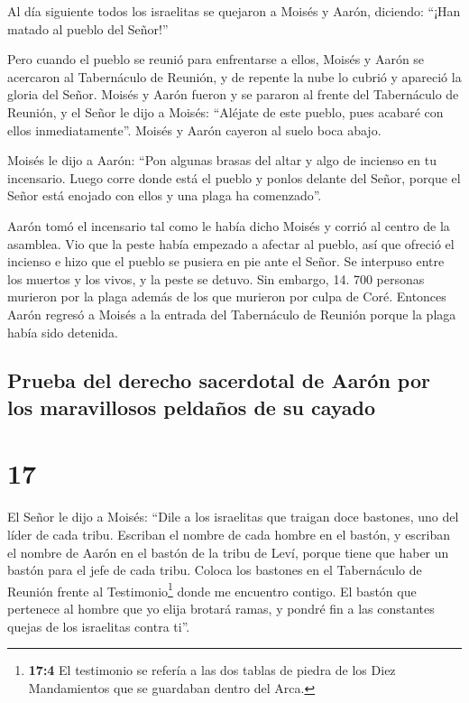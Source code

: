  Al día siguiente todos los israelitas se quejaron a
Moisés y Aarón, diciendo: ``¡Han matado al pueblo del Señor!''

 Pero cuando el pueblo se reunió para enfrentarse a
ellos, Moisés y Aarón se acercaron al Tabernáculo de Reunión, y de
repente la nube lo cubrió y apareció la gloria del Señor.
 Moisés y Aarón fueron y se pararon al frente del
Tabernáculo de Reunión,  y el Señor le dijo a Moisés:
 ``Aléjate de este pueblo, pues acabaré con ellos
inmediatamente''. Moisés y Aarón cayeron al suelo boca abajo.

 Moisés le dijo a Aarón: ``Pon algunas brasas del altar y
algo de incienso en tu incensario. Luego corre donde está el pueblo y
ponlos delante del Señor, porque el Señor está enojado con ellos y una
plaga ha comenzado''.

 Aarón tomó el incensario tal como le había dicho Moisés
y corrió al centro de la asamblea. Vio que la peste había empezado a
afectar al pueblo, así que ofreció el incienso e hizo que el pueblo se
pusiera en pie ante el Señor.  Se interpuso entre los
muertos y los vivos, y la peste se detuvo.  Sin embargo,
14. 700 personas murieron por la plaga además de los que murieron por
culpa de Coré.  Entonces Aarón regresó a Moisés a la
entrada del Tabernáculo de Reunión porque la plaga había sido detenida.

\hypertarget{prueba-del-derecho-sacerdotal-de-aaruxf3n-por-los-maravillosos-peldauxf1os-de-su-cayado}{%
\subsection{Prueba del derecho sacerdotal de Aarón por los maravillosos
peldaños de su
cayado}\label{prueba-del-derecho-sacerdotal-de-aaruxf3n-por-los-maravillosos-peldauxf1os-de-su-cayado}}

\hypertarget{section-16}{%
\section{17}\label{section-16}}

 El Señor le dijo a Moisés:  ``Dile a los
israelitas que traigan doce bastones, uno del líder de cada tribu.
Escriban el nombre de cada hombre en el bastón,  y
escriban el nombre de Aarón en el bastón de la tribu de Leví, porque
tiene que haber un bastón para el jefe de cada tribu. 
Coloca los bastones en el Tabernáculo de Reunión frente al
Testimonio\footnote{\textbf{17:4} El testimonio se refería a las dos
  tablas de piedra de los Diez Mandamientos que se guardaban dentro del
  Arca.} donde me encuentro contigo.  El bastón que
pertenece al hombre que yo elija brotará ramas, y pondré fin a las
constantes quejas de los israelitas contra ti''.


